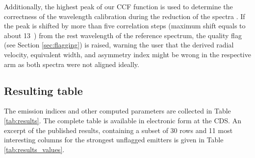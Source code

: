 Additionally, the highest peak of our CCF function is used to determine the correctness of the wavelength calibration during the reduction of the spectra \cite{2017MNRAS.464.1259K}. If the peak is shifted by more than five correlation steps (maximum shift equals to about 13~\kms) from the rest wavelength of the reference spectrum, the quality flag (see Section \ref{sec:flagging}) is raised, warning the user that the derived radial velocity, equivalent width, and asymmetry index might be wrong in the respective arm as both spectra were not aligned ideally.

\subsection{Resulting table}
\label{sec:results}
The emission indices and other computed parameters are collected in Table \ref{tab:results}. The complete table is available in electronic form at the CDS. An excerpt of the published results, containing a subset of 30 rows and 11 most interesting columns for the strongest unflagged emitters is given in Table \ref{tab:results_values}.

